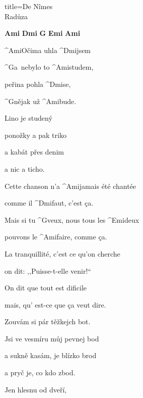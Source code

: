 \begin{song}{title=\predtitle\centering De N\^{i}mes \\\large Radůza  \vspace*{-0.3cm}}  %
\begin{centerjustified}

\begin{varwidth}[t]{0.48\textwidth}\setlength{\parindent}{0.45cm}  %

\textbf{Ami\,\,Dmi\,\,G\,\,Emi\,\,Ami}

\sloka
	^{Ami\z }Očima uhla ^{Dmi}jsem

	^{G\z }a~nebylo to ^{\z Ami}studem,

	peřina pohla ^{Dmi}se,

	^{G}nějak už ^{\z Ami}bude.

	\phantom{.}

	Lino je studený

	ponožky a pak triko

	a kabát přes denim

	a nic a ticho.

	Cette chanson n’a ^{Ami}jamais été chantée

	comme il ^{Dmi}faut, c’est ça.

	Mais si tu ^{G}veux, nous tous les ^{Emi}deux

	pouvons le ^{Ami}faire, comme ça.

	\phantom{.}

	La tranquillité, c’est ce qu’on cherche

	on dit: ,,Puisse-t-elle venir!{}``

	On dit que tout est dificile

	mais, qu’ est-ce que \c ca veut dire.

	Zouvám si pár těžkejch bot.

	Jsi ve vesmíru můj pevnej bod

	a sukně kasám, je blízko brod

	a pryč je, co kdo zbod.

\end{varwidth}\mezisloupci\begin{varwidth}[t]{0.48\textwidth}\setlength{\parindent}{0.45cm}
\vspace*{0.375cm}  %

\phantom{.}

\sloka
	Jen hlesnu od dveří,
	

\end{varwidth}
\end{centerjustified}
\end{song}

